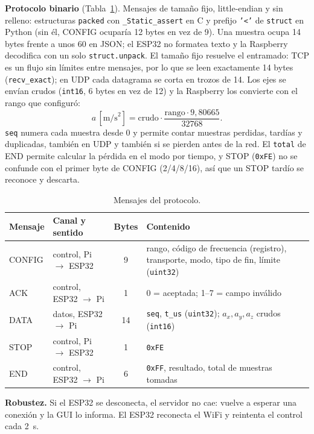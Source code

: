 \documentclass[11pt,a4paper]{report}
\begin{document}
\textbf{Protocolo binario} (Tabla~\ref{tab:mensajes}). Mensajes de tamaño fijo, little-endian y sin relleno: estructuras \texttt{packed} con \texttt{\_Static\_assert} en C y prefijo \texttt{'<'} de \texttt{struct} en Python (sin él, CONFIG ocuparía 12 bytes en vez de 9). Una muestra ocupa 14 bytes frente a unos 60 en JSON; el ESP32 no formatea texto y la Raspberry decodifica con un solo \texttt{struct.unpack}. El tamaño fijo resuelve el entramado: TCP es un flujo sin límites entre mensajes, por lo que se leen exactamente 14 bytes (\texttt{recv\_exact}); en UDP cada datagrama se corta en trozos de 14. Los ejes se envían crudos (\texttt{int16}, 6 bytes en vez de 12) y la Raspberry los convierte con el rango que configuró:
\begin{equation}
  a\,[\text{m/s}^2] = \text{crudo}\cdot\frac{\text{rango}\cdot 9{,}80665}{32768}.
  \label{eq:escala}
\end{equation}
\texttt{seq} numera cada muestra desde 0 y permite contar muestras perdidas, tardías y duplicadas, también en UDP y también si se pierden antes de la red. El \texttt{total} de END permite calcular la pérdida en el modo por tiempo, y STOP (\texttt{0xFE}) no se confunde con el primer byte de CONFIG (2/4/8/16), así que un STOP tardío se reconoce y descarta.

\begin{table}[h]
\centering\small
\caption{Mensajes del protocolo.}\label{tab:mensajes}
\begin{tabularx}{\textwidth}{@{}l l c X@{}}
\toprule
Mensaje & Canal y sentido & Bytes & Contenido \\ \midrule
CONFIG & control, Pi $\to$ ESP32 & 9 & rango, código de frecuencia (registro), transporte, modo, tipo de fin, límite (\texttt{uint32}) \\
ACK & control, ESP32 $\to$ Pi & 1 & 0 = aceptada; 1--7 = campo inválido \\
DATA & datos, ESP32 $\to$ Pi & 14 & \texttt{seq}, \texttt{t\_us} (\texttt{uint32}); $a_x, a_y, a_z$ crudos (\texttt{int16}) \\
STOP & control, Pi $\to$ ESP32 & 1 & \texttt{0xFE} \\
END & control, ESP32 $\to$ Pi & 6 & \texttt{0xFF}, resultado, total de muestras tomadas \\ \bottomrule
\end{tabularx}
\end{table}

\textbf{Robustez.} Si el ESP32 se desconecta, el servidor no cae: vuelve a esperar una conexión y la GUI lo informa. El ESP32 reconecta el WiFi y reintenta el control cada 2~s.
\end{document}
